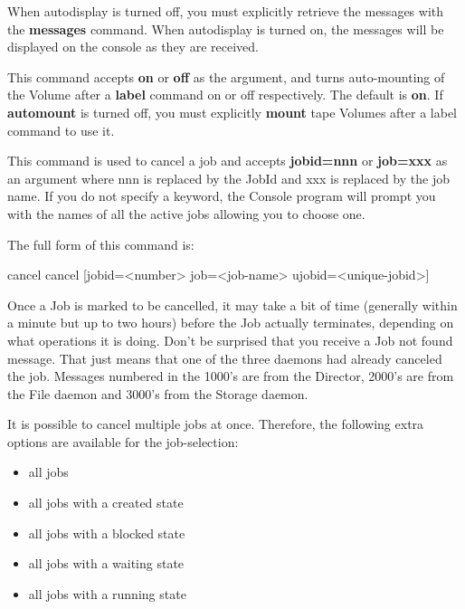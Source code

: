 \begin{description}
   When autodisplay is turned off, you must explicitly retrieve the
   messages with the {\bf messages} command.  When autodisplay is turned
   on, the messages will be displayed on the console as they are received.

\item [automount]
   This command accepts {\bf on} or {\bf off} as the argument, and turns
   auto-mounting of the Volume after a {\bf label} command on or off
   respectively.  The default is {\bf on}.  If {\bf automount} is turned
   off, you must explicitly {\bf mount} tape Volumes after a label command to
   use it.

\item [cancel]
   This command is used to cancel a job and accepts {\bf jobid=nnn} or {\bf
   job=xxx} as an argument where nnn is replaced by the JobId and xxx is
   replaced by the job name.  If you do not specify a keyword, the Console
   program will prompt you with the names of all the active jobs allowing
   you to choose one.

   The full form of this command is:

\begin{bconsole}{cancel}
cancel [jobid=<number> job=<job-name> ujobid=<unique-jobid>]
\end{bconsole}

   Once a Job is marked to be cancelled, it may take a bit of time
   (generally within a minute but up to two hours) before the Job actually
   terminates, depending on what operations it is doing.
   Don't be surprised that you receive a Job not found message. That just
   means that one of the three daemons had already canceled the job.
   Messages numbered in the 1000's are from the Director, 2000's are from
   the File daemon and 3000's from the Storage daemon.

   It is possible to cancel multiple jobs at once. Therefore, the following extra options are available for the job-selection:

   \begin{itemize}
    \item all jobs
    \item all jobs with a created state
    \item all jobs with a blocked state
    \item all jobs with a waiting state
    \item all jobs with a running state
   \end{itemize}


\end{description}

